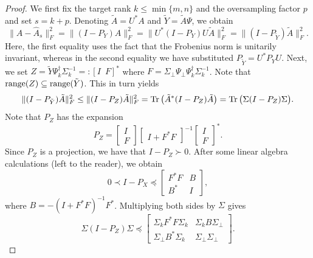\begin{proof}
We first fix the target rank $k \le \min{\{m,n\}}$ and the oversampling factor $p$ and set $s=k+p$. 
Denoting $\tilde{A} = U^{\ast} A$ and $\tilde{Y}= \tilde{A}\Psi$, we obtain
\begin{equation}\label{RSVDdeterministic1}
\| A - \hat{A}_s\|^2_F = \| (I - P_Y)A \|^2_F = \| U^{\ast} (I - P_Y) U\tilde{A} \|^2_F = \| ( I - P_{\tilde{Y}} ) \tilde{A} \|^2_F.
\end{equation}
Here, the first equality uses the fact that the Frobenius norm is unitarily invariant, whereas in the second equality we have substituted $P_{\tilde{Y}} = U^{\ast} P_Y U$.
Next, we set $Z=\tilde{Y} \Psi_k^{\dagger} \Sigma_k^{-1} =: [I \,\,\, F]^{\ast}$ where $F = \Sigma_\perp \Psi_\perp \Psi_k^{\dagger} \Sigma_k^{-1}$.
Note that $\operatorname{range}(Z) \subseteq \operatorname{range}(\tilde{Y})$. This in turn yields
\begin{equation}\label{RSVDdeterministic2}
\| (I-P_{\tilde{Y}} )\tilde{A}\|_F^2 \le \| (I - P_Z)\tilde{A} \|_F^2 = \operatorname{Tr} \big( \tilde{A}^{\ast} (I - P_Z)\tilde{A} \big) = \operatorname{Tr} \big(\Sigma (I - P_Z) \Sigma \big).
\end{equation}
Note that $P_Z$ has the expansion
$$
P_Z =  \begin{bmatrix}  I \\ F  \end{bmatrix}  \begin{bmatrix}  I + F^{\ast} F  \end{bmatrix}^{-1}  \begin{bmatrix}  I \\ F  \end{bmatrix}^{\ast}.
$$
Since $P_Z$ is a projection, we have that $I - P_Z \succ 0$. After some linear algebra calculations (left to the reader), we obtain
$$ 0 \prec I - P_X \preceq \begin{bmatrix}  F^{\ast}F & B \\ B^{\ast} &  I \end{bmatrix},$$
where $B = -(I+F^{\ast}F)^{-1} F^{\ast}$. Multiplying both sides by $\Sigma$ gives
\begin{equation}\label{RSVDdeterministic4}
\Sigma(I-P_Z)\Sigma  \preceq \begin{bmatrix}  \Sigma_k F^{\ast}F \Sigma_k & \Sigma_k B \Sigma_\perp \\ \Sigma_\perp B^{\ast} \Sigma_k & \Sigma_\perp \Sigma_\perp \end{bmatrix}.

\end{equation}
\end{proof}
